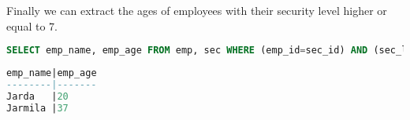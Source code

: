 \documentclass[a4paper]{article}
\begin{document}
Finally we can extract the ages of employees with their security level higher or equal to 7.

\vspace{0.5cm}
\begin{lstlisting}[language=SQL, backgroundcolor=\color{lbcolor}]
SELECT emp_name, emp_age FROM emp, sec WHERE (emp_id=sec_id) AND (sec_level>=7);
\end{lstlisting}
\begin{lstlisting}[language=SQL, backgroundcolor=\color{gbcolor}]
emp_name|emp_age
--------|-------
Jarda   |20     
Jarmila |37     
\end{lstlisting}
\end{document}
